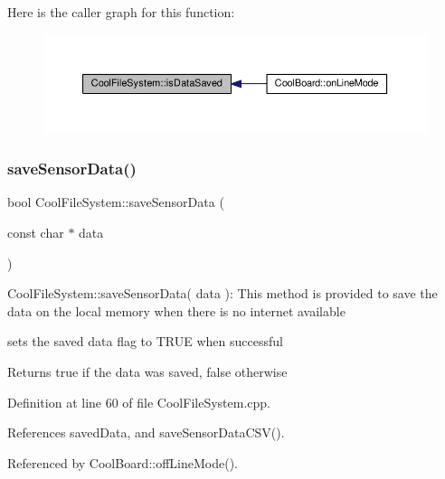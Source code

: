 Here is the caller graph for this function\+:
\nopagebreak
\begin{figure}[H]
\begin{center}
\leavevmode
\includegraphics[width=350pt]{classCoolFileSystem_a5a7eaeea7a9fbf8aaef651d862fa3b5b_icgraph}
\end{center}
\end{figure}
\mbox{\label{classCoolFileSystem_afa3a4feae94871d4d3b6bebb701c2e67}} 
\subsubsection{\texorpdfstring{save\+Sensor\+Data()}{saveSensorData()}}
{\footnotesize\ttfamily bool Cool\+File\+System\+::save\+Sensor\+Data (\begin{DoxyParamCaption}\item[{const char $\ast$}]{data }\end{DoxyParamCaption})}

Cool\+File\+System\+::save\+Sensor\+Data( data )\+: This method is provided to save the data on the local memory when there is no internet available

sets the saved data flag to T\+R\+UE when successful

\begin{DoxyReturn}{Returns}
true if the data was saved, false otherwise 
\end{DoxyReturn}


Definition at line 60 of file Cool\+File\+System.\+cpp.



References saved\+Data, and save\+Sensor\+Data\+C\+S\+V().



Referenced by Cool\+Board\+::off\+Line\+Mode().


